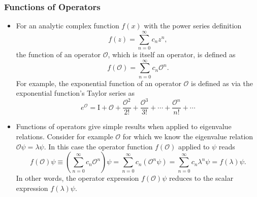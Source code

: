 \documentclass[11pt, a4paper]{article}
\renewcommand{\O}{\mathcal{O}}  %
\newcommand{\p}{\psi}  %
\begin{document}
\subsubsection{Functions of Operators}
\begin{itemize}
	\item For an analytic complex function $ f(x) $ with the power series definition
	\begin{equation*}
		f(z) = \sum_{n=0}^{\infty}c_{n}z^{n},
	\end{equation*}
    the function of an operator $ \O $, which is itself an operator, is defined as
	\begin{equation*}
		f(\O) = \sum_{n = 0}^{\infty}c_{n} \O^{n}.	
	\end{equation*}
	For example, the exponential function of an operator $ \O $ is defined as via the exponential function's Taylor series as
	\begin{equation*}
		e^{\O} = \mathrm{I} + \O + \frac{\O^{2}}{2!} + \frac{\O^{3}}{3!} + \cdots + \frac{\O^{n}}{n!} + \cdots 
	\end{equation*}
	
	\item Functions of operators give simple results when applied to eigenvalue relations. Consider for example $ \O $ for which we know the eigenvalue relation $ \O \p =  \lambda \p $. In this case the operator function $ f(\O) $ applied to $ \p $ reads
	\begin{equation*}
		f(\O) \psi \equiv \left(\sum_{n = 0}^{\infty}c_{n} \O^{n}\right)\p = \sum_{n=0}^{\infty}c_{n} \left(\O^{n} \p\right) =  \sum_{n=0}^{\infty}c_{n} \lambda^{n} \p = f(\lambda) \p.
	\end{equation*}
	In other words, the operator expression $ f(\O) \psi $ reduces to the scalar expression $ f(\lambda) \p $. 
\end{itemize}
	
\end{document}
